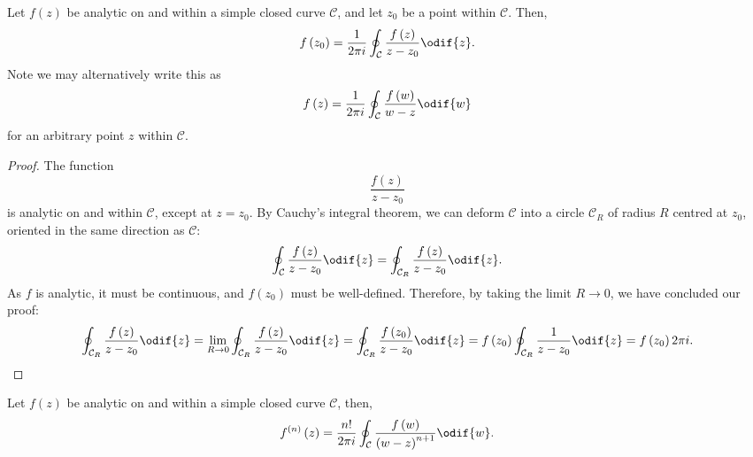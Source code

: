 \documentclass{article}
\begin{document}
\begin{theorem}
    Let \(f\left( z \right)\) be analytic on and within a simple closed
    curve \(\mathcal{C}\), and let \(z_0\) be a point within
    \(\mathcal{C}\). Then,
    \begin{equation*}
        f\left( z_0 \right) = \frac{1}{2 \pi i} \oint_{\mathcal{C}} \frac{f\left( z \right)}{z - z_0} \odif{z}.
    \end{equation*}
    Note we may alternatively write this as
    \begin{equation*}
        f\left( z \right) = \frac{1}{2 \pi i} \oint_{\mathcal{C}} \frac{f\left( w \right)}{w - z} \odif{w}
    \end{equation*}
    for an arbitrary point \(z\) within \(\mathcal{C}\).
\end{theorem}
\begin{proof}
    The function
    \begin{equation*}
        \frac{f\left( z \right)}{z - z_0}
    \end{equation*}
    is analytic on and within \(\mathcal{C}\), except at \(z = z_0\).
    By Cauchy's integral theorem, we can deform \(\mathcal{C}\) into a
    circle \(\mathcal{C}_R\) of radius \(R\) centred at \(z_0\),
    oriented in the same direction as \(\mathcal{C}\):
    \begin{equation*}
        \oint_{\mathcal{C}} \frac{f\left( z \right)}{z - z_0} \odif{z} = \oint_{\mathcal{C}_R} \frac{f\left( z \right)}{z - z_0} \odif{z}.
    \end{equation*}
    As \(f\) is analytic, it must be continuous, and \(f\left( z_0 \right)\)
    must be well-defined. Therefore, by taking the limit \(R \to 0\), we
    have concluded our proof:
    \begin{equation*}
        \oint_{\mathcal{C}_R} \frac{f\left( z \right)}{z - z_0} \odif{z} = \lim_{R \to 0} \oint_{\mathcal{C}_R} \frac{f\left( z \right)}{z - z_0} \odif{z} = \oint_{\mathcal{C}_R} \frac{f\left( z_0 \right)}{z - z_0} \odif{z} = f\left( z_0 \right) \oint_{\mathcal{C}_R} \frac{1}{z - z_0} \odif{z} = f\left( z_0 \right) 2 \pi i.
    \end{equation*}
\end{proof}
\begin{theorem}
    Let \(f\left( z \right)\) be analytic on and within a simple closed
    curve \(\mathcal{C}\), then,
    \begin{equation*}
        f^{\left( n \right)}\left( z \right) = \frac{n!}{2 \pi i} \oint_{\mathcal{C}} \frac{f\left( w \right)}{\left( w - z \right)^{n + 1}} \odif{w}.
    \end{equation*}
\end{theorem}
\end{document}
